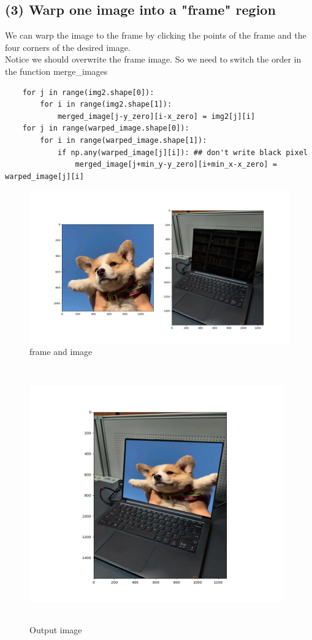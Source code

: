 \documentclass[a4paper,UTF8]{article}
\numberwithin{equation}{section}
\begin{document}
\subsection*{(3) Warp one image into a "frame" region}
We can warp the image to the frame by clicking the points of the frame and the four corners of the desired image. \\
Notice we should overwrite the frame image. So we need to switch the order in the function merge\_images
\begin{lstlisting}
    for j in range(img2.shape[0]):
        for i in range(img2.shape[1]):
            merged_image[j-y_zero][i-x_zero] = img2[j][i]
	for j in range(warped_image.shape[0]):
		for i in range(warped_image.shape[1]):
			if np.any(warped_image[j][i]): ## don't write black pixel
				merged_image[j+min_y-y_zero][i+min_x-x_zero] = warped_image[j][i]
\end{lstlisting}
\begin{figure}[H]
	\centering  %
	\includegraphics[width=1\textwidth]{frame_plot.png}  %
	\caption{frame and image}  %
\end{figure}
\begin{figure}[H]
	\centering  %
	\includegraphics[width=11cm,height=11cm]{frame_merged.png}  %
	\caption{Output image}  %
\end{figure}
\end{document}
